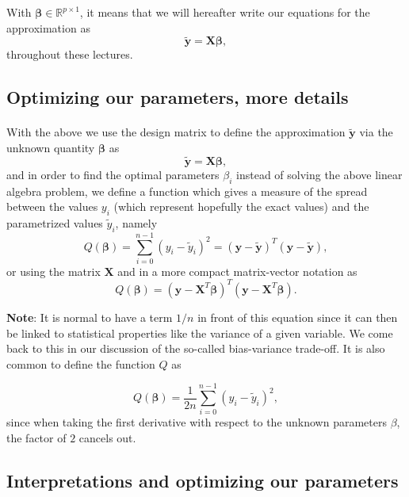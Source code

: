 \documentclass[%
oneside,                 %
final,                   %
10pt]{article}
\begin{document}
With $\bm{\beta}\in {\mathbb{R}}^{p\times 1}$, it means that we will hereafter write our equations for the approximation as
\[
\bm{\tilde{y}}= \bm{X}\bm{\beta},
\]
throughout these lectures. 


\subsection*{Optimizing our parameters, more details}

\paragraph{}
With the above we use the design matrix to define the approximation $\bm{\tilde{y}}$ via the unknown quantity $\bm{\beta}$ as
\[
\bm{\tilde{y}}= \bm{X}\bm{\beta},
\]
and in order to find the optimal parameters $\beta_i$ instead of solving the above linear algebra problem, we define a function which gives a measure of the spread between the values $y_i$ (which represent hopefully the exact values) and the parametrized values $\tilde{y}_i$, namely
\[
Q(\bm{\beta})=\sum_{i=0}^{n-1}\left(y_i-\tilde{y}_i\right)^2=\left(\bm{y}-\bm{\tilde{y}}\right)^T\left(\bm{y}-\bm{\tilde{y}}\right),
\]
or using the matrix $\bm{X}$ and in a more compact matrix-vector notation as
\[
Q(\bm{\beta})=\left(\bm{y}-\bm{X}^T\bm{\beta}\right)^T\left(\bm{y}-\bm{X}^T\bm{\beta}\right).
\]

\textbf{Note}: It is normal to have a term $1/n$ in front of this equation
since it can then be linked to statistical properties like the
variance of a given variable. We come back to this in our discussion
of the so-called bias-variance trade-off.  It is also common to define
the function $Q$ as

\[
Q(\bm{\beta})=\frac{1}{2n}\sum_{i=0}^{n-1}\left(y_i-\tilde{y}_i\right)^2,
\]
since when taking the first derivative with respect to the unknown parameters $\beta$, the factor of $2$ cancels out.




\subsection*{Interpretations and optimizing our parameters}

\paragraph{}
\end{document}
